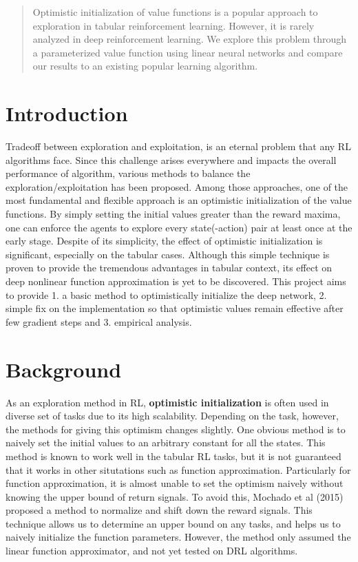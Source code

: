 \documentclass{article}
\theoremstyle{plain}
\theoremstyle{definition}
\theoremstyle{remark}
\begin{document}
\begin{abstract}
Optimistic initialization of value functions is a popular approach to exploration
in tabular reinforcement learning. However, it is rarely analyzed
in deep reinforcement learning. We explore this problem through a parameterized
value function using linear neural networks and compare our results to an existing popular 
learning algorithm.
\end{abstract}

\section{Introduction}
Tradeoff between exploration and exploitation, is an eternal problem that any RL algorithms face.
Since this challenge arises everywhere and impacts the overall performance of algorithm, various methods to balance the exploration/exploitation has been proposed.
Among those approaches, one of the most fundamental and flexible approach is an optimistic initialization of the value functions.
By simply setting the initial values greater than the reward maxima, one can enforce the agents to explore every state(-action) pair at least once at the early stage.
Despite of its simplicity, the effect of optimistic initialization is significant, especially on the tabular cases.
Although this simple technique is proven to provide the tremendous advantages in tabular context, its effect on deep nonlinear function approximation is yet to be discovered.
This project aims to provide 1. a basic method to optimistically initialize the deep network, 2. simple fix on the implementation so that optimistic values remain effective after few gradient steps and 3. empirical analysis.


\medskip
\section{Background}
As an exploration method in RL, \textbf{optimistic initialization} is often used in diverse set of tasks due to its high scalability.
Depending on the task, however, the methods for giving this optimism changes slightly.
One obvious method is to naively set the initial values to an arbitrary constant for all the states.
This method is known to work well in the tabular RL tasks, but it is not guaranteed that it works in other situtations such as function approximation.
Particularly for function approximation, it is almost unable to set the optimism naively without knowing the upper bound of return signals.
To avoid this, Mochado et al (2015) proposed a method to normalize and shift down the reward signals.
This technique allows us to determine an upper bound on any tasks, and helps us to naively initialize the function parameters.
However, the method only assumed the linear function approximator, and not yet tested on DRL algorithms.
\end{document}
